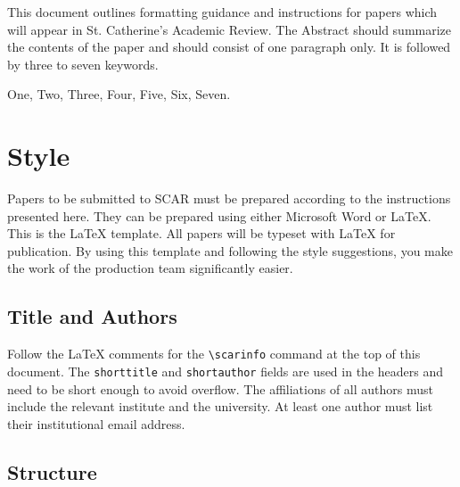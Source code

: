 \documentclass[area=socialsciences,review]{scararticle}
\begin{document}
\maketitle

\begin{scarabstractandkeywords}%
    This document outlines formatting guidance and instructions for papers which will appear in St. Catherine’s Academic Review. The Abstract should summarize the contents of the paper and should consist of one paragraph only. It is followed by three to seven keywords.
    \begin{scarkeywords}%
        One,
        Two,
        Three,
        Four,
        Five,
        Six,
        Seven.
    \end{scarkeywords}
\end{scarabstractandkeywords}



\section{Style}
Papers to be submitted to SCAR must be prepared according to the instructions presented here.
They can be prepared using either Microsoft Word or \LaTeX{}.
This is the \LaTeX{} template.
All papers will be typeset with LaTeX for publication.
By using this template and following the style suggestions, you make the work of the production team significantly easier.

\subsection{Title and Authors}
Follow the \LaTeX{} comments for the \verb|\scarinfo| command at the top of this document.
The \verb|shorttitle| and \verb|shortauthor| fields are used in the headers and need to be short enough to avoid overflow.
The affiliations of all authors must include the relevant institute and the university.
At least one author must list their institutional email address.

\subsection{Structure}
\end{document}

